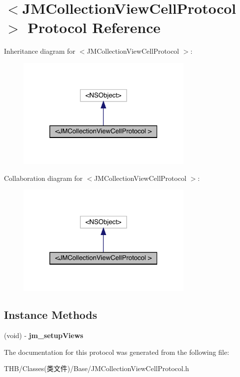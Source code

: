 \hypertarget{protocol_j_m_collection_view_cell_protocol_01-p}{}\section{$<$J\+M\+Collection\+View\+Cell\+Protocol $>$ Protocol Reference}
\label{protocol_j_m_collection_view_cell_protocol_01-p}


Inheritance diagram for $<$J\+M\+Collection\+View\+Cell\+Protocol $>$\+:\nopagebreak
\begin{figure}[H]
\begin{center}
\leavevmode
\includegraphics[width=243pt]{protocol_j_m_collection_view_cell_protocol_01-p__inherit__graph}
\end{center}
\end{figure}


Collaboration diagram for $<$J\+M\+Collection\+View\+Cell\+Protocol $>$\+:\nopagebreak
\begin{figure}[H]
\begin{center}
\leavevmode
\includegraphics[width=243pt]{protocol_j_m_collection_view_cell_protocol_01-p__coll__graph}
\end{center}
\end{figure}
\subsection*{Instance Methods}
\begin{DoxyCompactItemize}
\item 
\mbox{\label{protocol_j_m_collection_view_cell_protocol_01-p_a5c78ef8fce5dfdaa57a98d6a1a0a6961}} 
(void) -\/ {\bfseries jm\+\_\+setup\+Views}
\end{DoxyCompactItemize}


The documentation for this protocol was generated from the following file\+:\begin{DoxyCompactItemize}
\item 
T\+H\+B/\+Classes(类文件)/\+Base/J\+M\+Collection\+View\+Cell\+Protocol.\+h\end{DoxyCompactItemize}
